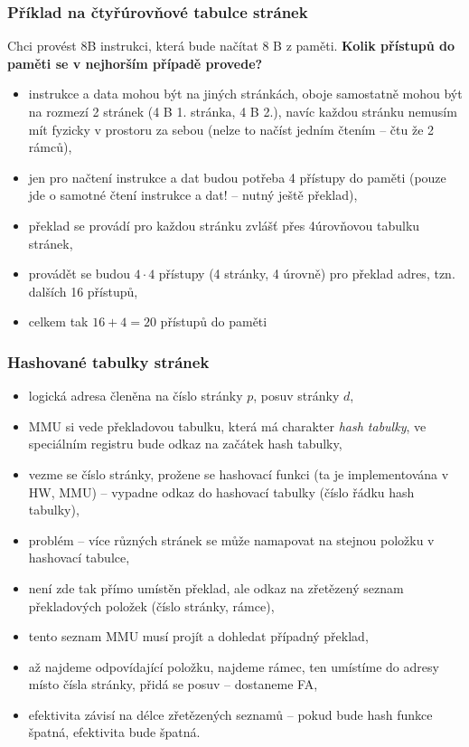 \documentclass[a4paper, 11pt]{article}
\begin{document}
\subsubsection{Příklad na čtyřúrovňové tabulce stránek}
Chci provést 8B instrukci, která bude načítat 8 B z paměti. \textbf{Kolik přístupů do paměti se v nejhorším případě provede?}
\begin{itemize}
    \item instrukce a data mohou být na jiných stránkách, oboje samostatně mohou být na rozmezí 2 stránek (4 B 1. stránka, 4 B 2.), navíc každou stránku nemusím mít fyzicky v prostoru za sebou (nelze to načíst jedním čtením -- čtu že 2 rámců),
    \item jen pro načtení instrukce a dat budou potřeba 4 přístupy do paměti (pouze jde o samotné čtení instrukce a dat! -- nutný ještě překlad),
    \item překlad se provádí pro každou stránku zvlášť přes 4úrovňovou tabulku stránek,
    \item provádět se budou $4\cdot4$ přístupy (4 stránky, 4 úrovně) pro překlad adres, tzn. dalších 16 přístupů,
    \item celkem tak $16 + 4 = 20$ přístupů do paměti
\end{itemize}

\subsubsection{Hashované tabulky stránek}
\begin{itemize}
    \item logická adresa členěna na číslo stránky $p$, posuv stránky $d$,
    \item MMU si vede překladovou tabulku, která má charakter \emph{hash tabulky}, ve speciálním registru bude odkaz na začátek hash tabulky,
    \item vezme se číslo stránky, prožene se hashovací funkci (ta je implementována v HW, MMU) -- vypadne odkaz do hashovací tabulky (číslo řádku hash tabulky),
    \item problém -- více různých stránek se může namapovat na stejnou položku v hashovací tabulce,
    \item není zde tak přímo umístěn překlad, ale odkaz na zřetězený seznam překladových položek (číslo stránky, rámce), 
    \item tento seznam MMU musí projít a dohledat případný překlad,
    \item až najdeme odpovídající položku, najdeme rámec, ten umístíme do adresy místo čísla stránky, přidá se posuv -- dostaneme FA,
    \item efektivita závisí na délce zřetězených seznamů -- pokud bude hash funkce špatná, efektivita bude špatná.
\end{itemize}
\end{document}

